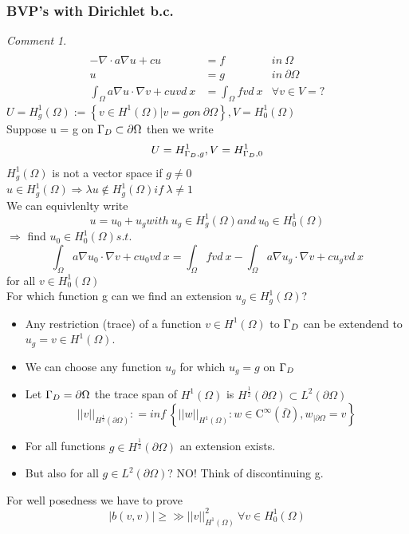 \documentclass[english]{article}
\theoremstyle{definition}
\theoremstyle{remark}
\newtheorem*{comm}{Comment}
\newcommand{\f}[2]{\frac{#1}{#2}}							%
\newcommand{\p}{\partial}
\newcommand{\lam}{\lambda}			%
\newcommand{\OO}{\Omega}
\newcommand{\cinf}{\tx{C}^\infty}
\newcommand{\drw}{\Rightarrow}			%
\newcommand{\tri}{\nabla}
\newcommand{\tx}[1]{\text{#1}}
\begin{document}
\subsubsection{BVP's with Dirichlet b.c.}
\begin{comm}
\begin{align*} \\
-\nabla \cdot a \nabla u + cu &=f & in\ \OO\\
u &=g & in\ \p\OO\\
\int_\OO a \nabla u \cdot \nabla v + cuv d\ x &= \int_\OO fv d\ x & \forall v \in V = ?
\end{align*}
$U = H^1 _g (\OO) := \left\{v \in H^1 (\OO) | v = g on\ \p\OO \right\}, V= H^1 _0(\OO)$\\
Suppose u = g on $\GG_D \subset \p \OO$ then we write $$U= H^1 _{\Gamma_D,g}, V= H^1_{\Gamma_D, 0}$$
$H^1 _g(\OO)$ is not a vector space if $g \neq 0$\\
$u\in H^1 _g(\OO)  \drw \lam u \notin H^1 _g(\OO) if\ \lam \neq 1$\\
We can equivlenlty write $$u = u_0 + u _g with\ u_g \in H^1_g(\OO) and\ u_0 \in H^1 _0 (\OO)$$
$\drw$ find $u_0 \in H^1 _0 (\OO) s.t.\ $ 
$$\int_\OO a \tri u_0 \cdot \tri v + c u_0v d\ x = \int_{\OO}f v d\ x - \int_\OO a \tri u_g \cdot \tri v + c u_g v d\ x$$
for all $v \in H^1 _0(\OO)$\\
For which function g can we find an extension $u_g \in H^1_g (\OO)$?\\
\begin{itemize}
	\item Any restriction (trace) of a function $v\in H^1(\OO)$ to $\Gamma_D$ can be extendend to $u_g=v \in H^1(\OO)$.\\
\item We can choose any function $u_g$ for which $u_g = g$ on $\Gamma_D$\\
\item Let $\GG_D = \p\OO$ the trace span of $H^1(\OO)$ is $H^{\f{1}{2}}(\p\OO) \subset L^2(\p \OO)$
$$||v||_{H^{\f{1}{2}}(\p\OO)} : = inf\ \left\{||w||_{H^1(\OO)} : w \in \cinf (\bar\OO) , w_{|\p\OO} = v\right\}$$
\item For all functions $g \in H^{\f{1}{2}}(\p\OO)$ an extension exists.
\item But also for all $g\in L^2 (\p \OO)$? NO! Think of discontinuing g.
\end{itemize}
\end{comm}
For well posedness we have to prove 
$$|b(v,v)|\geq \gg ||v||^2 _{H^1(\OO)} \ \forall v \in H^1 _0 (\OO)$$
\end{document}
